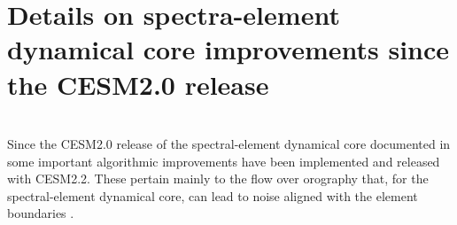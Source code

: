 \documentclass[draft]{agujournal2019}
\begin{document}
%
%



%
%
%
%
\appendix
\section{Details on spectra-element dynamical core improvements since the CESM2.0 release}
{\color{red}{PHL working on this!}}\\

Since the CESM2.0 release of the spectral-element dynamical core documented in  some important algorithmic improvements have been implemented and released with CESM2.2. These pertain mainly to the flow over orography that, for the spectral-element dynamical core, can lead to noise aligned with the element boundaries \cite{HL2018MWR}.
\end{document}
